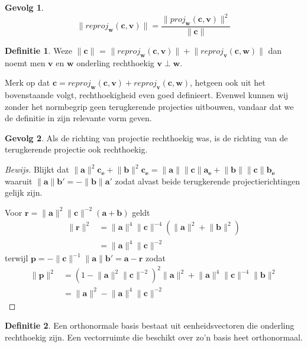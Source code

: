 \documentclass{amsart}
\theoremstyle{definition}
\newtheorem{dfn}{Definitie}[section]
\newtheorem{csq}{Gevolg}[section]
\newenvironment{bewijs}{\begin{proof}[Bewijs]}{\end{proof}}
\newcommand{\norm}[1]{\lVert{#1}\rVert}
\newcommand{\vvec}[1][v]{\mathbf{#1}}
\newcommand{\uvec}[1][v]{\vvec[#1]_\mathbf{e}}
\newcommand{\vnorm}[1]{\norm{\vvec[#1]}}
\begin{document}
\begin{csq}
    \begin{equation*}
        \norm{reproj_{\vvec[w]}(\vvec[c], \vvec)} = \frac{\norm{proj_{\vvec[w]}(\vvec[c], \vvec)}^2}{\vnorm c}
    \end{equation*}
\end{csq}

\begin{dfn}
    Weze $\vnorm c$ = $\norm{reproj_{\vvec[w]}(\vvec[c], \vvec)} + \norm{reproj_{\vvec}(\vvec[c], \vvec[w])}$ dan noemt men $\vvec$ en $\vvec[w]$ onderling rechthoekig $\vvec \perp \vvec[w]$.
\end{dfn}

Merk op dat $\vvec[c] = reproj_{\vvec[w]}(\vvec[c], \vvec) + reproj_{\vvec}(\vvec[c], \vvec[w])$, hetgeen ook uit het bovenstaande volgt, rechthoekigheid even goed definieert.
Evenwel kunnen wij zonder het normbegrip geen terugkerende projecties uitbouwen, vandaar dat we de definitie in zijn relevante vorm geven.

\begin{csq}
    Als de richting van projectie rechthoekig was, is de richting van de terugkerende projectie ook rechthoekig.
    \begin{bewijs}
        Blijkt dat $\vnorm a^2\uvec[c] + \vnorm b^2\uvec[c] = \vnorm a\vnorm c\uvec[a] + \vnorm b\vnorm c\uvec[b]$ waaruit $\vnorm a\vvec[b'] = -\vnorm b\vvec[a']$ zodat alvast beide terugkerende projectierichtingen gelijk zijn.

        Voor $\vvec[r] = \vnorm a^2\vnorm c^{-2}(\vvec[a]+\vvec[b])$ geldt
        \begin{align*}
            \vnorm r^2
             & = \vnorm a^4\vnorm c^{-4}\left(\vnorm a^2 + \vnorm b^2\right) \\
             & = \vnorm a^4\vnorm c^{-2}
        \end{align*}
        terwijl $\vvec[p] = -\vnorm c^{-1}\vnorm a\vvec[b'] = \vvec[a] - \vvec[r]$ zodat
        \begin{align*}
            \vnorm p^2
             & = (1 - \vnorm a^2\vnorm c^{-2})^2\vnorm a^2 + \vnorm a^4\vnorm c^{-4}\vnorm b^2 \\
             & = \vnorm a^2 - \vnorm a^4\vnorm c^{-2}
        \end{align*}
    \end{bewijs}
\end{csq}

\begin{dfn}
    Een orthonormale basis bestaat uit eenheidsvectoren die onderling rechthoekig zijn. Een vectorruimte die beschikt over zo'n basis heet orthonormaal.
\end{dfn}
\end{document}
